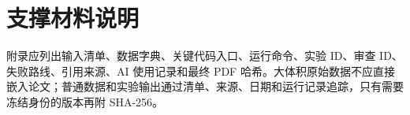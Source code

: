 \section{支撑材料说明}

附录应列出输入清单、数据字典、关键代码入口、运行命令、实验 ID、审查 ID、失败路线、引用来源、AI 使用记录和最终 PDF 哈希。大体积原始数据不应直接嵌入论文；普通数据和实验输出通过清单、来源、日期和运行记录追踪，只有需要冻结身份的版本再附 SHA-256。
